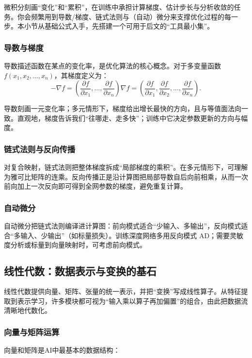 \begin{itemize}
微积分刻画“变化”和“累积”，在训练中承担计算梯度、估计步长与分析收敛的任务。你会频繁用到导数/梯度、链式法则与（自动）微分来支撑优化过程的每一步。本小节从基础公式入手，先搭建一个可用于后文的“工具最小集”。

\subsubsection{导数与梯度}

导数描述函数在某点的变化率，是优化算法的核心概念。对于多变量函数 $f(x_1, x_2, \ldots, x_n)$，其梯度定义为：
 $$
-\nabla f = \left(\frac{\partial f}{\partial x_1}, \ldots, \frac{\partial f}{\partial x_n}\right)
\nabla f = \left(\frac{\partial f}{\partial x_1}, \frac{\partial f}{\partial x_2}, \ldots, \frac{\partial f}{\partial x_n}\right).
 $$
 
导数刻画一元变化率；多元情形下，梯度给出增长最快的方向，且与等值面法向一致。直观地，梯度告诉我们“往哪走、走多快”；训练中它决定参数更新的方向与幅度。

\subsubsection{链式法则与反向传播}

对复合映射，链式法则把整体梯度拆成“局部梯度的乘积”。在多元情形下，可理解为雅可比矩阵的连乘。反向传播正是沿计算图把局部导数自后向前相乘，从而一次前向加上一次反向即可得到全网参数的梯度，避免重复计算。
 
\subsubsection{自动微分}

自动微分把链式法则编译进计算图：前向模式适合“少输入、多输出”，反向模式适合“多输入、少输出”（如标量损失）。训练深度网络多用反向模式 AD；需要灵敏度分析或标量到向量映射时，可考虑前向模式。

\subsection{线性代数：数据表示与变换的基石}

线性代数提供向量、矩阵、张量的统一表示，并把“变换”写成线性算子。从特征提取到表示学习，许多模块都可视为“输入乘以算子再加偏置”的组合，由此把数据流清晰地代数化。

\subsubsection{向量与矩阵运算}
向量和矩阵是AI中最基本的数据结构：


\end{itemize}
